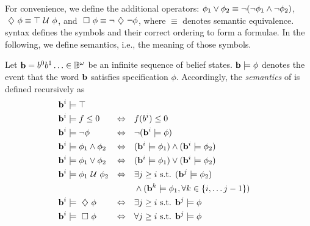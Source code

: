 \documentclass[conference]{IEEEtran}
\begin{document}
    For convenience, we define the additional operators:
    $\phi_1 \vee \phi_2 \equiv  \neg (\neg \phi_1 \wedge \neg \phi_2)$,
    $\ \diamondsuit\  \phi \equiv \top \ \mathcal{U}\  \phi$, and
    $\ \square\  \phi \equiv \neg \ \diamondsuit\  \neg \phi$,
    where $\equiv$ denotes semantic equivalence. \DTL syntax defines the symbols and their correct ordering to form a formulae. In the following, we define \DTL semantics, i.e., the meaning of those symbols.

    \begin{definition}
    \label{def:gdtl-semantics}
    Let $\mathbf{b} = b^0b^1 \ldots \in \mathbb{B}^{\omega}$
    be an infinite sequence of belief states. $\mathbf{b} \models \phi$ denotes the event that the word $\mathbf{b}$ satisfies specification $\phi$. Accordingly, the {\em semantics} of \DTL is defined recursively as
    \begin{align*}
    &\BF{b}^i \models  \top  & \\
    &\BF{b}^i \models f \leq 0 & \Equiv\quad & f(b^i) \leq 0\\ %
    &\BF{b}^i \models \notltl \phi & \Equiv\quad & \notltl (\BF{b}^i \models \phi) \\
    &\BF{b}^i \models \phi_1 \andltl  \phi_2  & \Equiv\quad & ( \BF{b}^i \models \phi_1 ) \andltl ( \BF{b}^i \models \phi_2 ) \\
    &\BF{b}^i \models \phi_1 \orltl  \phi_2  & \Equiv\quad & ( \BF{b}^i \models \phi_1 ) \orltl ( \BF{b}^i \models \phi_2 ) \\
    &\BF{b}^i \models  \phi_1 \Until \phi_2 & \Equiv\quad & \exists j \geq i \text{ s.t. } ( \BF{b}^j \models \phi_2 ) \\
    & & & \andltl (\BF{b}^k \models \phi_1, \forall k \in \{i, \ldots j-1\})\\
    &\BF{b}^i \models \Event \phi  & \Equiv\quad & \exists j \geq i \text{ s.t. } \BF{b}^j \models \phi \\
    &\BF{b}^i \models \Always \phi  & \Equiv\quad & \forall j \geq i \text{ s.t. } \BF{b}^j \models \phi
    \end{align*}
    
    \end{definition}
\end{document}
